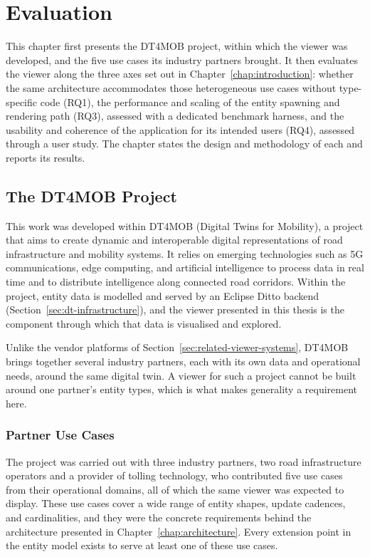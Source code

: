 \chapter{Evaluation}
\label{chap:evaluation}

\begin{introduction}
This chapter first presents the DT4MOB project, within which the viewer was developed, and the five use cases its industry partners brought. It then evaluates the viewer along the three axes set out in Chapter~\ref{chap:introduction}: whether the same architecture accommodates those heterogeneous use cases without type-specific code (RQ1), the performance and scaling of the entity spawning and rendering path (RQ3), assessed with a dedicated benchmark harness, and the usability and coherence of the application for its intended users (RQ4), assessed through a user study. The chapter states the design and methodology of each and reports its results.
\end{introduction}

\section{The DT4MOB Project}
\label{sec:dt4mob}

This work was developed within DT4MOB (Digital Twins for Mobility), a project that aims to create dynamic and interoperable digital representations of road infrastructure and mobility systems. It relies on emerging technologies such as 5G communications, edge computing, and artificial intelligence to process data in real time and to distribute intelligence along connected road corridors. Within the project, entity data is modelled and served by an Eclipse Ditto backend (Section~\ref{sec:dt-infrastructure}), and the viewer presented in this thesis is the component through which that data is visualised and explored.

Unlike the vendor platforms of Section~\ref{sec:related-viewer-systems}, DT4MOB brings together several industry partners, each with its own data and operational needs, around the same digital twin. A viewer for such a project cannot be built around one partner's entity types, which is what makes generality a requirement here.

\subsection{Partner Use Cases}
\label{sec:usecases}

The project was carried out with three industry partners, two road infrastructure operators and a provider of tolling technology, who contributed five use cases from their operational domains, all of which the same viewer was expected to display. These use cases cover a wide range of entity shapes, update cadences, and cardinalities, and they were the concrete requirements behind the architecture presented in Chapter~\ref{chap:architecture}. Every extension point in the entity model exists to serve at least one of these use cases.


